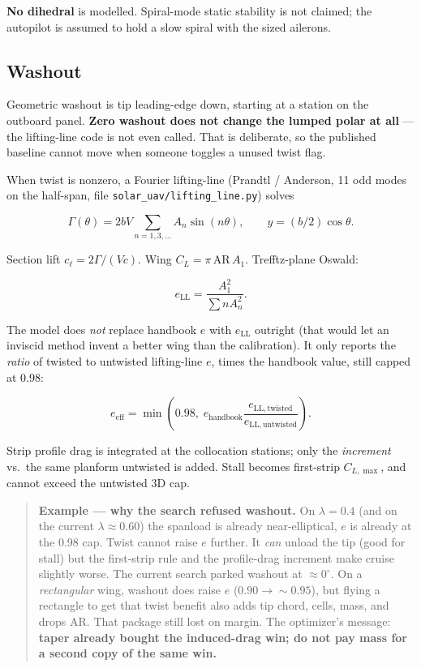 \documentclass[11pt,letterpaper]{article}
\newcommand{\code}[1]{\texttt{#1}}
\newenvironment{examplebox}{\begin{quote}\small}{\end{quote}}
\begin{document}
\textbf{No dihedral} is modelled. Spiral-mode static stability is not claimed; the autopilot is assumed to hold a slow spiral with the sized ailerons.

\subsection{Washout}
\label{sec:washout}

Geometric washout is tip leading-edge down, starting at a station on the outboard panel. \textbf{Zero washout does not change the lumped polar at all} --- the lifting-line code is not even called. That is deliberate, so the published baseline cannot move when someone toggles a unused twist flag.

When twist is nonzero, a Fourier lifting-line (Prandtl / Anderson, 11 odd modes on the half-span, file \code{solar\_uav/lifting\_line.py}) solves

\begin{equation}
  \Gamma(\theta) = 2 b V \sum_{n=1,3,\ldots} A_n \sin(n\theta),
  \qquad y = (b/2)\cos\theta.
\end{equation}

Section lift $c_\ell = 2\Gamma /(V c)$. Wing $C_L = \pi\,\mathrm{AR}\, A_1$. Trefftz-plane Oswald:

\begin{equation}
  e_\mathrm{LL} = \frac{A_1^2}{\sum n A_n^2}.
\end{equation}

The model does \emph{not} replace handbook $e$ with $e_\mathrm{LL}$ outright (that would let an inviscid method invent a better wing than the calibration). It only reports the \emph{ratio} of twisted to untwisted lifting-line $e$, times the handbook value, still capped at 0.98:

\begin{equation}
  e_\mathrm{eff} = \min\left(0.98,\;
    e_\mathrm{handbook} \frac{e_\mathrm{LL,twisted}}{e_\mathrm{LL,untwisted}}\right).
\end{equation}

Strip profile drag is integrated at the collocation stations; only the \emph{increment} vs.\ the same planform untwisted is added. Stall becomes first-strip $C_{L,\max}$, and cannot exceed the untwisted 3D cap.

\begin{examplebox}
\textbf{Example --- why the search refused washout.}
On $\lambda = 0.4$ (and on the current $\lambda \approx 0.60$) the spanload is already near-elliptical, $e$ is already at the 0.98 cap. Twist cannot raise $e$ further. It \emph{can} unload the tip (good for stall) but the first-strip rule and the profile-drag increment make cruise slightly worse. The current search parked washout at $\approx 0^\circ$. On a \emph{rectangular} wing, washout does raise $e$ ($0.90 \to \sim 0.95$), but flying a rectangle to get that twist benefit also adds tip chord, cells, mass, and drops AR. That package still lost on margin. The optimizer's message: \textbf{taper already bought the induced-drag win; do not pay mass for a second copy of the same win.}
\end{examplebox}
\end{document}
